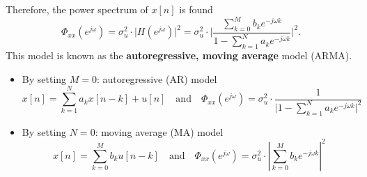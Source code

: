 Therefore, the power spectrum of $x[n]$ is found
\[
    \Phi_{xx}(e^{j\omega}) = \sigma_u^2 \cdot \lvert H(e^{j\omega}) \rvert^2 = \sigma_u^2 \cdot \bigg \lvert \frac{\sum_{k=0}^M b_k e^{-j\omega k}}{1-\sum_{k=1}^N a_k e^{-j\omega k}} \bigg\rvert^2 . 
\]
This model is known as the \textbf{autoregressive, moving average} model (ARMA).
\begin{itemize}
    \item By setting $M = 0$: autoregressive (AR) model
    \[
        x[n] = \sum_{k=1}^{N} a_{k}x[n-k] + u[n]
        \quad \text{and} \quad
        \Phi_{xx}(e^{j\omega}) = \sigma_u^2 \cdot  \frac{1}{\lvert 1-\sum_{k=1}^N a_k e^{-j\omega k}\rvert^2}
    \]

    \item By setting $N = 0$: moving average (MA) model
    \[
        x[n] = \sum_{k=0}^{M} b_{k}u[n-k]
        \quad \text{and} \quad
        \Phi_{xx}(e^{j\omega}) = \sigma_u^2 \cdot  \left\vert \sum_{k=0}^M b_k e^{-j\omega k} \right\vert^2
    \]
\end{itemize}

